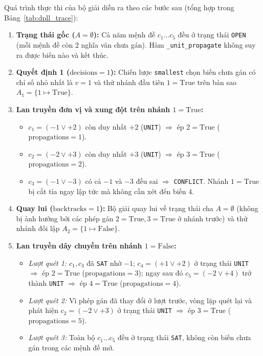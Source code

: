 Quá trình thực thi của bộ giải diễn ra theo các bước sau (tổng hợp trong Bảng~\ref{tab:dpll_trace}):
\begin{enumerate}
    \item \textbf{Trạng thái gốc ($A = \emptyset$):} Cả năm mệnh đề $c_1 \dots c_5$ đều ở trạng thái \texttt{OPEN} (mỗi mệnh đề còn $2$ nghĩa văn chưa gán). Hàm \texttt{\_unit\_propagate} không suy ra được biến nào và kết thúc.
    \item \textbf{Quyết định 1 ($\text{decisions} = 1$):} Chiến lược \texttt{smallest} chọn biến chưa gán có chỉ số nhỏ nhất là $v = 1$ và thử nhánh đầu tiên $1 = \text{True}$ trên bản sao $A_1 = \{1 \mapsto \text{True}\}$.
    \item \textbf{Lan truyền đơn vị và xung đột trên nhánh $1 = \text{True}$:}
    \begin{itemize}
        \item $c_1 = (-1 \lor +2)$ còn duy nhất $+2$ (\texttt{UNIT}) $\Rightarrow$ ép $2 = \text{True}$ ($\text{propagations} = 1$).
        \item $c_2 = (-2 \lor +3)$ còn duy nhất $+3$ (\texttt{UNIT}) $\Rightarrow$ ép $3 = \text{True}$ ($\text{propagations} = 2$).
        \item $c_3 = (-1 \lor -3)$ có cả $-1$ và $-3$ đều sai $\Rightarrow$ \texttt{CONFLICT}. Nhánh $1 = \text{True}$ bị cắt tỉa ngay lập tức mà không cần xét đến biến $4$.
    \end{itemize}
    \item \textbf{Quay lui ($\text{backtracks} = 1$):} Bộ giải quay lui về trạng thái cha $A = \emptyset$ (không bị ảnh hưởng bởi các phép gán $2 = \text{True}, 3 = \text{True}$ ở nhánh trước) và thử nhánh đối lập $A_2 = \{1 \mapsto \text{False}\}$.
    \item \textbf{Lan truyền dây chuyền trên nhánh $1 = \text{False}$:}
    \begin{itemize}
        \item \textit{Lượt quét 1:} $c_1, c_3$ đã \texttt{SAT} nhờ $-1$; $c_4 = (+1 \lor +2)$ ở trạng thái \texttt{UNIT} $\Rightarrow$ ép $2 = \text{True}$ ($\text{propagations} = 3$); ngay sau đó $c_5 = (-2 \lor +4)$ trở thành \texttt{UNIT} $\Rightarrow$ ép $4 = \text{True}$ ($\text{propagations} = 4$).
        \item \textit{Lượt quét 2:} Vì phép gán đã thay đổi ở lượt trước, vòng lặp quét lại và phát hiện $c_2 = (-2 \lor +3)$ ở trạng thái \texttt{UNIT} $\Rightarrow$ ép $3 = \text{True}$ ($\text{propagations} = 5$).
        \item \textit{Lượt quét 3:} Toàn bộ $c_1 \dots c_5$ đều ở trạng thái \texttt{SAT}, không còn biến chưa gán trong các mệnh đề mở.
    \end{itemize}
\end{enumerate}


